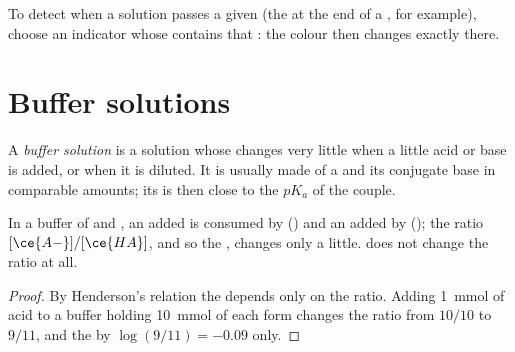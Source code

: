 \begin{method}\label{met:g12:buffers-predominance:indicator}
To detect when a solution passes a given  (the  at the end of a
, for example), choose an indicator whose 
contains that : the colour then changes exactly there.
\end{method}

\section{Buffer solutions}

\begin{definition}\label{def:g12:buffers-predominance:buffer}
A \emph{buffer solution} is a solution whose 
changes very little when a little acid or base is added, or when it is
diluted. It is usually made of a  and its conjugate base in
comparable amounts; its  is then close to the $pK_a$ of the couple.
\end{definition}

\begin{proposition}\label{prop:g12:buffers-predominance:buffer}
In a buffer of  and , an added  is consumed by
 () and an added  by 
(); the ratio $[\ce{A-}]/[\ce{HA}]$, and so the
, changes only a little.  does not change the ratio at all.
\end{proposition}

\begin{proof}
By Henderson's relation the  depends only on the ratio. Adding
\qty{1}{mmol} of acid to a buffer holding \qty{10}{mmol} of each form
changes the ratio from $10/10$ to $9/11$, and the  by
$\log(9/11) = -0.09$ only.
\end{proof}


